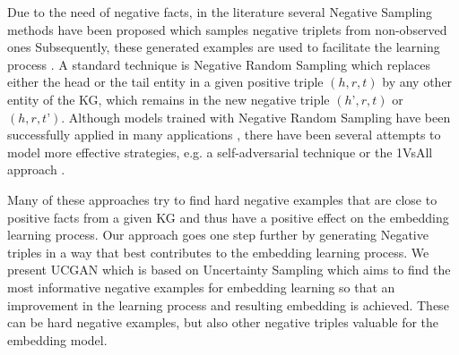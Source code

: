 Due to the need of negative facts, in the literature several Negative Sampling methods have been proposed which samples negative triplets from non-observed ones \cite{Alam2020AffinityDN} 
Subsequently, these generated examples are used to facilitate the learning process . 
A standard technique is Negative Random Sampling which replaces either the head or the tail entity in a given positive triple $(h, r, t)$ by any other entity of the \ac{KG}, which remains in the new negative triple $(h’,r,t)$ or $(h,r,t’)$. 
Although models trained with Negative Random Sampling have been successfully applied in many applications \cite{TransE}, there have been several attempts to model more effective strategies, e.g. 
a self-adversarial technique \cite{RotatE} or the 1VsAll approach \cite{ConvE}.

Many of these approaches try to find hard negative examples that are close to positive facts from a given \ac{KG} and thus have a positive effect on the embedding learning process.
Our approach goes one step further by generating Negative triples in a way that best contributes to the embedding learning process. 
We present \ac{UCGAN} which is based on Uncertainty Sampling which aims to
find the most informative negative examples for embedding learning so that an improvement in the learning process and resulting embedding is achieved.
These can be hard negative examples, but also other negative triples valuable for the embedding model.